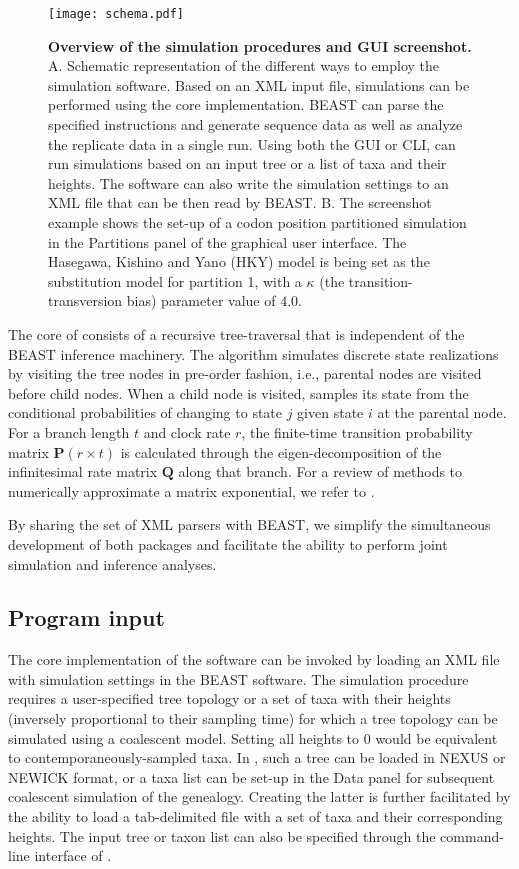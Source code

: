 \begin{figure}[h!]
\centering
\texttt{[image: schema.pdf]} 
\caption{
{ \footnotesize 
{\bf Overview of the {\bussname} simulation procedures and GUI screenshot.}
A. Schematic representation of the different ways to employ the {\bussname} simulation software.
Based on an XML input file, simulations can be performed using the core implementation. %
BEAST can parse the specified {\bussname} instructions and generate sequence data as well as analyze the replicate data in a single run.
Using both the GUI or CLI, {\bussname} can run simulations based on an input tree or a list of taxa and their heights.
The software can also write the simulation settings to an XML file that can be then read by BEAST. 
B. The screenshot example shows the set-up of a codon position partitioned simulation in the Partitions panel of the graphical user interface.
The Hasegawa, Kishino and Yano (HKY) model is being set as the substitution model for partition 1, with a $\kappa$ (the transition-transversion bias) parameter value of $4.0$.
}%
}
\label{fig:screenshot}
\end{figure}


The core of {\bussname} consists of a recursive tree-traversal that is independent of the BEAST inference machinery. 
The algorithm simulates discrete state realizations by visiting the tree nodes in pre-order fashion, i.e., parental nodes are visited before child nodes.
When a child node is visited, {\bussname} samples its state from the conditional probabilities of changing to state $j$ given state $i$ at the parental node.
For a branch length $t$ and clock rate $r$, the finite-time transition probability matrix $\mathbf{P}\left(r \times t\right)$ is calculated through the eigen-decomposition of the infinitesimal rate matrix $\mathbf{Q}$ along that branch. 
For a review of methods to numerically approximate a matrix exponential, we refer to \cite{Moler1978}.

By sharing the set of XML parsers with BEAST, we
simplify the simultaneous development of both packages and facilitate the ability to perform joint simulation and inference analyses.

\subsection{Program input} 

The core implementation of the software can be invoked by loading an XML file with simulation settings in the BEAST software.
The simulation procedure requires a user-specified tree topology or a set of taxa with their heights (inversely proportional to their sampling time) for which a tree topology can be simulated using a coalescent model.
Setting all heights to 0 would be equivalent to contemporaneously-sampled taxa.
In {\bussname}, such a tree can be loaded in NEXUS or NEWICK format, or a taxa list can be set-up in the Data panel for subsequent coalescent simulation of the genealogy.
Creating the latter is further facilitated by the ability to load a tab-delimited file with a set of taxa and their corresponding heights.
The input tree or taxon list can also be specified through the command-line interface of {\bussname}.
 
